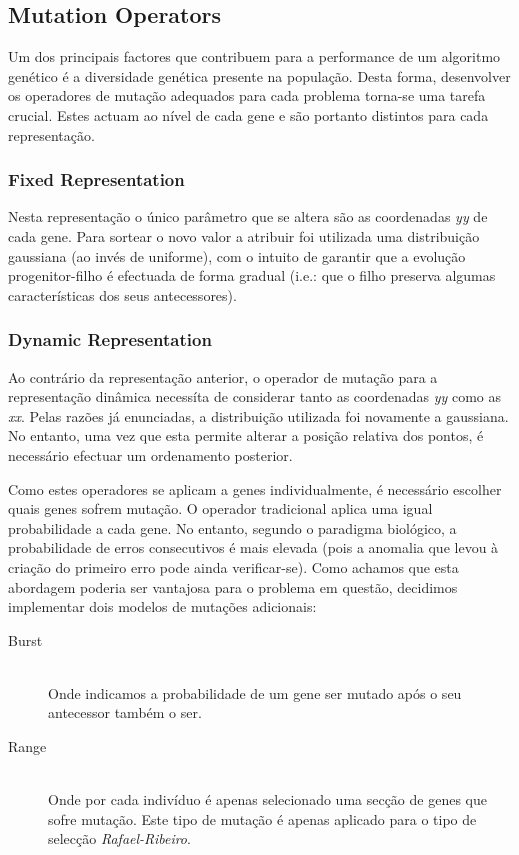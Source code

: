 \documentclass[a4paper]{article}
\begin{document}
\cleardoublepage
\subsection{Mutation Operators}
\indent \indent Um dos principais factores que contribuem para a performance de um algoritmo genético é a diversidade genética presente na população.
Desta forma, desenvolver os operadores de mutação adequados para cada problema torna-se uma tarefa crucial.
Estes actuam ao nível de cada gene e são portanto distintos para cada representação. 

\subsubsection{Fixed Representation}
\indent \indent Nesta representação o único parâmetro que se altera são as coordenadas \emph{yy} de cada gene.
Para sortear o novo valor a atribuir foi utilizada uma distribuição gaussiana (ao invés de uniforme), com o intuito 
de garantir que a evolução progenitor-filho é efectuada de forma gradual (i.e.: que o filho preserva algumas características dos
seus antecessores).

\subsubsection{Dynamic Representation}
\indent \indent Ao contrário da representação anterior, o operador de mutação para a representação dinâmica necessíta de considerar
tanto as coordenadas \emph{yy} como as \emph{xx}. Pelas razões já enunciadas, a distribuição utilizada foi novamente a gaussiana.
No entanto, uma vez que esta permite alterar a posição relativa dos pontos, é necessário efectuar um ordenamento posterior.

\indent Como estes operadores se aplicam a genes individualmente, é necessário escolher quais genes sofrem mutação.
O operador tradicional aplica uma igual probabilidade a cada gene. No entanto, segundo o paradigma biológico,
a probabilidade de erros consecutivos é mais elevada (pois a anomalia que levou à criação do primeiro erro pode ainda verificar-se).
Como achamos que esta abordagem poderia ser vantajosa para o problema em questão, decidimos implementar dois modelos de mutações adicionais:

\begin{description}
	\item[Burst] \hfill \\ 
		Onde indicamos a probabilidade de um gene ser mutado após o seu antecessor também o ser.

	\item[Range] \hfill \\ 
		Onde por cada indivíduo é apenas selecionado uma secção de genes que sofre mutação.
		Este tipo de mutação é apenas aplicado para o tipo de selecção \emph{Rafael-Ribeiro}.
\end{description}
 
\end{document}
